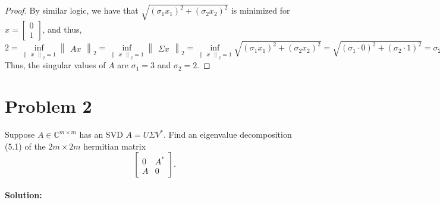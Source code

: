 \documentclass{article}
\begin{document}
\begin{proof}
    By similar logic, we have that $\sqrt{(\sigma_1 x_1)^2 + (\sigma_2 x_2)^2}$ is minimized for $x = \begin{bmatrix}
        0 \\ 1
    \end{bmatrix}$,
    and thus,
    \[ 2 = \inf_{\begin{Vmatrix}x\end{Vmatrix}_2 = 1}
    \begin{Vmatrix}
        Ax
    \end{Vmatrix}_2 = 
    \inf_{\begin{Vmatrix}x\end{Vmatrix}_2 = 1} 
    \begin{Vmatrix}
        \Sigma x
    \end{Vmatrix}_2
    =
    \inf_{\begin{Vmatrix}x\end{Vmatrix}_2 = 1} \sqrt{(\sigma_1 x_1)^2 + (\sigma_2 x_2)^2} = \sqrt{(\sigma_1 \cdot 0)^2 + (\sigma_2 \cdot 1)^2} = \sigma_2. \] Thus, the singular values of $A$ are $\sigma_1 = 3$ and $\sigma_2 = 2$.
\end{proof}

\pagebreak

\section*{Problem 2}
Suppose $A \in \mathbb{C}^{m \times m}$ has an SVD $A = U\Sigma V^*$. Find an eigenvalue decomposition (5.1) of the $2m \times 2m$ hermitian matrix 
\[
    \begin{bmatrix}
        0 & A^*\\
        A & 0
    \end{bmatrix}.
\]\\

\textbf{Solution:}
\end{document}
